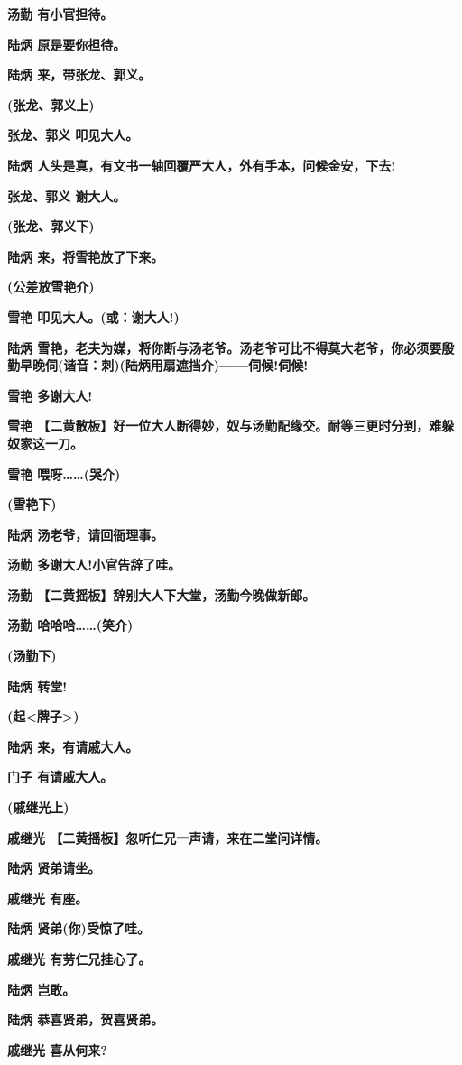 \textbf{汤勤 有小官担待。}

\textbf{陆炳 原是要你担待。}

\textbf{陆炳 来，带张龙、郭义。}

\textbf{(张龙、郭义上)}

\textbf{张龙、郭义 叩见大人。}

\textbf{陆炳 人头是真，有文书一轴回覆严大人，外有手本，问候金安，下去!}

\textbf{张龙、郭义 谢大人。}

\textbf{(张龙、郭义下)}

\textbf{陆炳 来，将雪艳放了下来。}

\textbf{(公差放雪艳介)}

\textbf{雪艳 叩见大人。(或：谢大人!)}

\textbf{陆炳
雪艳，老夫为媒，将你断与汤老爷。汤老爷可比不得莫大老爷，你必须要殷勤早晚伺(谐音：刺)(陆炳用扇遮挡介)------伺候!伺候!}

\textbf{雪艳 多谢大人!}

\textbf{雪艳
【二黄散板】好一位大人断得妙，奴与汤勤配缘交。耐等三更时分到，难躲奴家这一刀。}

\textbf{雪艳 喂呀\ldots{}\ldots{}(哭介)}

\textbf{(雪艳下)}

\textbf{陆炳 汤老爷，请回衙理事。}

\textbf{汤勤 多谢大人!小官告辞了哇。}

\textbf{汤勤 【二黄摇板】辞别大人下大堂，汤勤今晚做新郎。}

\textbf{汤勤 哈哈哈\ldots{}\ldots{}(笑介)}

\textbf{(汤勤下)}

\textbf{陆炳 转堂!}

\textbf{(起\textless{}牌子\textgreater{})}

\textbf{陆炳 来，有请戚大人。}

\textbf{门子 有请戚大人。}

\textbf{(戚继光上)}

\textbf{戚继光 【二黄摇板】忽听仁兄一声请，来在二堂问详情。}

\textbf{陆炳 贤弟请坐。}

\textbf{戚继光 有座。}

\textbf{陆炳 贤弟(你)受惊了哇。}

\textbf{戚继光 有劳仁兄挂心了。}

\textbf{陆炳 岂敢。}

\textbf{陆炳 恭喜贤弟，贺喜贤弟。}

\textbf{戚继光 喜从何来?}

